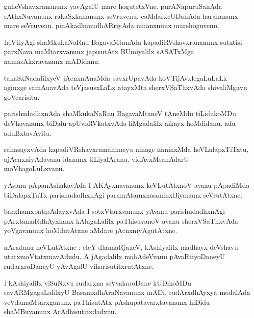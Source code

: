 \documentclass{article}
\begin{document}
\begin{mn}
guheVshavxrananunx yavAgalU mare hogutetxVne. purANapuruSanAda sAthxNuvanunx rakaSxkananunx 
seVruvenu. caMdarxcUDanAda harananunx mare seVruvenu. pinAkadhanudhARriyAda ninanxnunx marehoguvenu.
\end{mn}

\begin{mn}
IriVtiyAgi shaMkukaNaRnu BagavaMtanAda kapadiRVshavxrananunx sutxtisi parxNava 
maMtarxvanunx japisutAtx BUmiyalilx sASATxMga namasAkxravanunx mADidanu.
\end{mn}

\begin{mn}
takaSxNadalilxyeV jAcnxnAnaMda savxrUpavAda koVTijAvxlegaLuLaLx aginxge samAnavAda teVjasusxLaLx 
atayxMta sherxVSaThxvAda shivaliMgavu goVcarisitu.
\end{mn}

\begin{mn}
parishudadhxnAda shaMkukaNaRnu BagavaMtaneV tAneMdu tiLidukoMDu deVhavanunx biDalu apUvoRVkatxvAda 
liMgadalilx aikayx hoMdidanu. adu aduBxtavAyitu.
\end{mn}

\begin{mn}
rahasayxvAda kapadiVRshavxramahimeyu ninage naninxMda heVLalapxTiTxtu, ajAcnxniyAdavanu idanunx 
tiLiyalAranu. vidAvxMsanAdarU moVhagoLuLxvanu.
\end{mn}

\begin{mn}
yAvanu pApanAshakavAda I AKAyxnavanunx keVLutAtxnoV avanu pApadiMda biDalapxTuTx parishudadhxnAgi 
paramAtamxnasaninxBiyanunx seVrutAtxne.
\end{mn}

\begin{mn}
barxhamxpatipAdayxvAda I sotxVtarxvanunx yAvanu parishudadhxnAgi pArxtamaRdhAyxhanx kAlagaLalilx 
paThisuvanoV avanu sherxVSaThxvAda yoVgavanunx hoMdutAtxne aMdare jAcnxniyAgutAtxne.
\end{mn}


\begin{mn}
nAradanu heVLutAtxne : eleY dhamaRjaneV, kAshiyalilx madhayx deVshavu utatxmoVtatxmavAdudu. A
jAgadalilx mahAdeVvanu pAvaRtiyoDaneyU rudarxroDaneyU yAvAgalU viharisutitxrutAtxne.
\end{mn}

\begin{mn}
I kAshiyalilx viSuNxvu rudarxna seVvakaroDane kUDikoMDu savARMgagaLalilxyU BasamxdhAraNavanunx 
mADi, rudArxdhAyxya modalAda veVdamaMtarxganunx paThisutAtx pAshupatavarxtavanunx hiDidu 
shaMBuvanunx ArAdhisutitxdadxnu.
\end{mn}
\end{document}
